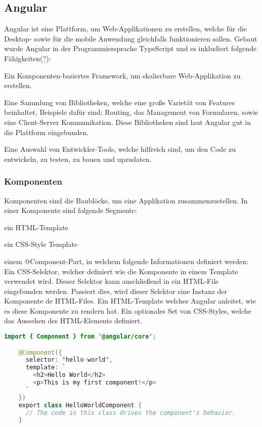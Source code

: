 \subsection{Angular}

Angular ist eine Plattform, um Web-Applikationen zu erstellen, welche für die Desktop- sowie für die mobile Anwendung gleichfalls funktionieren sollen. Gebaut wurde Angular in der Programmiersprache TypeScript und es inkludiert folgende Fähigkeiten(?):

\begin{compactitem}
    \item Ein Komponenten-basiertes Framework, um skalierbare Web-Applikation zu erstellen.
    \item Eine Sammlung von Bibliotheken, welche eine große Varietät von Features beinhaltet, Beispiele dafür sind: Routing, das Management von Formularen, sowie eine Client-Server Kommunikation. Diese Bibliotheken sind laut Angular gut in die Plattform eingebunden.       
    \item Eine Auswahl von Entwickler-Tools, welche hilfreich sind, um den Code zu entwickeln, zu testen, zu bauen und upzudaten.
\end{compactitem}

\subsubsection{Komponenten}
Komponenten sind die Baublöcke, um eine Applikation zusammenzustellen. In einer Komponente sind folgende Segmente: 

\begin{compactitem}
    \item ein HTML-Template
    \item ein CSS-Style Template      
    \item einem @Component-Part, in welchem folgende Informationen definiert werden:
    \subitem Ein CSS-Selektor, welcher definiert wie die Komponente in einem Template verwendet wird. Dieser Selektor kann anschließend in ein HTML-File eingebunden werden. Passiert dies, wird dieser Selektor eine Instanz der Komponente de HTML-Files.
    \subitem Ein HTML-Template welches Angular anleitet, wie es diese Komponente zu rendern hat.
    \subitem Ein optionales Set von CSS-Styles, welche das Aussehen des HTML-Elements definiert.
\end{compactitem}

\begin{lstlisting}[language=java,caption=Beispiel für eine minimierte Angular Komponente,label=lst:impl:angularBsp]
    import { Component } from '@angular/core';

    @Component({
      selector: 'hello-world',
      template: `
        <h2>Hello World</h2>
        <p>This is my first component!</p>
      `
    })
    export class HelloWorldComponent {
      // The code in this class drives the component's behavior.
    }
\end{lstlisting}

